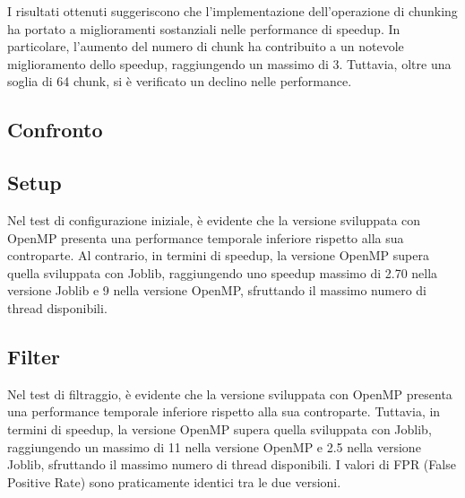 I risultati ottenuti suggeriscono che l'implementazione dell'operazione di chunking ha portato a miglioramenti
sostanziali nelle performance di speedup.
In particolare, l'aumento del numero di chunk ha contribuito a un notevole miglioramento dello speedup,
raggiungendo un massimo di 3.
Tuttavia, oltre una soglia di 64 chunk, si è verificato un declino nelle performance.

\subsection{Confronto}\label{subsec:confronto}
\subsection{Setup}\label{subsec:confronto-setup}
Nel test di configurazione iniziale, è evidente che la versione sviluppata con OpenMP presenta una performance temporale
inferiore rispetto alla sua controparte.
Al contrario, in termini di speedup, la versione OpenMP supera quella sviluppata con Joblib,
raggiungendo uno speedup massimo di 2.70 nella versione Joblib e 9 nella versione OpenMP,
sfruttando il massimo numero di thread disponibili.

\subsection{Filter}\label{subsec:confronto-filter}
Nel test di filtraggio, è evidente che la versione sviluppata con OpenMP presenta una performance temporale inferiore
rispetto alla sua controparte.
Tuttavia, in termini di speedup, la versione OpenMP supera quella sviluppata con Joblib, raggiungendo un massimo di 11
nella versione OpenMP e 2.5 nella versione Joblib, sfruttando il massimo numero di thread disponibili.
I valori di FPR (False Positive Rate) sono praticamente identici tra le due versioni.




